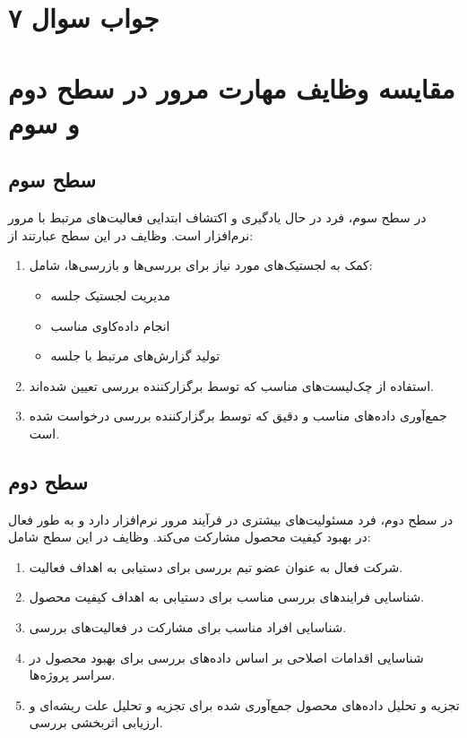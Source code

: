 \section*{جواب سوال ۷}

\section*{مقایسه وظایف مهارت مرور در سطح دوم و سوم}

\subsection*{سطح سوم }
در سطح سوم، فرد در حال یادگیری و اکتشاف ابتدایی فعالیت‌های مرتبط با مرور نرم‌افزار است. وظایف در این سطح عبارتند از:

\begin{enumerate}
	\item کمک به لجستیک‌های مورد نیاز برای بررسی‌ها و بازرسی‌ها، شامل:
	\begin{itemize}
		\item مدیریت لجستیک جلسه
		\item انجام داده‌کاوی مناسب
		\item تولید گزارش‌های مرتبط با جلسه
	\end{itemize}
	\item استفاده از چک‌لیست‌های مناسب که توسط برگزارکننده بررسی تعیین شده‌اند.
	\item جمع‌آوری داده‌های مناسب و دقیق که توسط برگزارکننده بررسی درخواست شده است.
\end{enumerate}

\subsection*{سطح دوم }
در سطح دوم، فرد مسئولیت‌های بیشتری در فرآیند مرور نرم‌افزار دارد و به طور فعال در بهبود کیفیت محصول مشارکت می‌کند. وظایف در این سطح شامل:

\begin{enumerate}
	\item شرکت فعال به عنوان عضو تیم بررسی برای دستیابی به اهداف فعالیت.
	\item شناسایی فرایندهای بررسی مناسب برای دستیابی به اهداف کیفیت محصول.
	\item شناسایی افراد مناسب برای مشارکت در فعالیت‌های بررسی.
	\item شناسایی اقدامات اصلاحی بر اساس داده‌های بررسی برای بهبود محصول در سراسر پروژه‌ها.
	\item تجزیه و تحلیل داده‌های محصول جمع‌آوری شده برای تجزیه و تحلیل علت ریشه‌ای و ارزیابی اثربخشی بررسی.
\end{enumerate}

